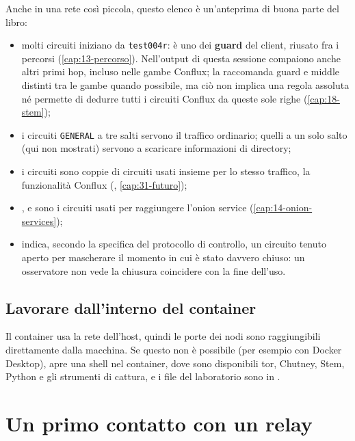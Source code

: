 Anche in una rete così piccola, questo elenco è un'anteprima di buona parte del libro:
\begin{itemize}
  \item molti circuiti iniziano da \texttt{test004r}: è uno dei \textbf{guard} del client, riusato fra i percorsi (\cref{cap:13-percorso}). Nell'output di questa sessione compaiono anche altri primi hop, incluso nelle gambe Conflux; la  raccomanda guard e middle distinti tra le gambe quando possibile, ma ciò non implica una regola assoluta né permette di dedurre tutti i circuiti Conflux da queste sole righe (\cref{cap:18-stem});
  \item i circuiti \texttt{GENERAL} a tre salti servono il traffico ordinario; quelli a un solo salto (qui non mostrati) servono a scaricare informazioni di directory;
  \item i circuiti  sono coppie di circuiti usati insieme per lo stesso traffico, la funzionalità Conflux (, \cref{cap:31-futuro});
  \item {},  e  sono i circuiti usati per raggiungere l'onion service (\cref{cap:14-onion-services});
  \item {} indica, secondo la specifica del protocollo di controllo, un circuito tenuto aperto per mascherare il momento in cui è stato davvero chiuso: un osservatore non vede la chiusura coincidere con la fine dell'uso.
\end{itemize}

\subsection{Lavorare dall'interno del container}\label{sec:rp-shell}

Il container usa la rete dell'host, quindi le porte dei nodi sono raggiungibili direttamente dalla macchina. Se questo non è possibile (per esempio con Docker Desktop),  apre una shell nel container, dove sono disponibili tor, Chutney, Stem, Python e gli strumenti di cattura, e i file del laboratorio sono in .

\section{Un primo contatto con un relay}\label{sec:rp-contatto}

